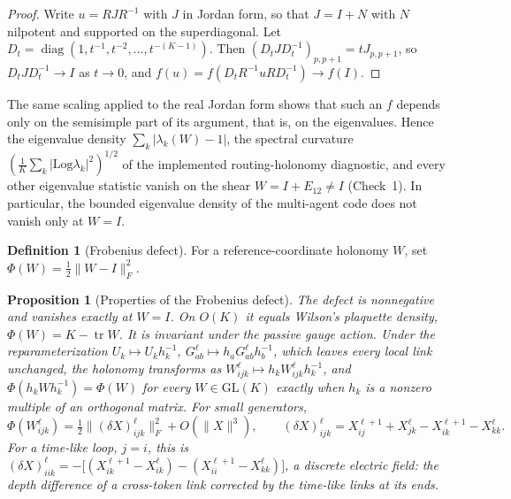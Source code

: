 \documentclass[11pt]{article}
\newtheorem{proposition}[theorem]{Proposition}
\theoremstyle{definition}
\newtheorem{definition}[theorem]{Definition}
\theoremstyle{remark}
\providecommand{\GL}{\mathrm{GL}}
\providecommand{\tr}{\operatorname{tr}}
\begin{document}
\begin{proof}
Write $u=RJR^{-1}$ with $J$ in Jordan form, so that $J=I+N$ with $N$ nilpotent and supported on the superdiagonal. Let $D_t=\operatorname{diag}(1,t^{-1},t^{-2},\dots,t^{-(K-1)})$. Then $(D_tJD_t^{-1})_{p,p+1}=tJ_{p,p+1}$, so $D_tJD_t^{-1}\to I$ as $t\to0$, and $f(u)=f(D_tR^{-1}uRD_t^{-1})\to f(I)$.
\end{proof}

The same scaling applied to the real Jordan form shows that such an $f$ depends only on the semisimple part of its argument, that is, on the eigenvalues. Hence the eigenvalue density $\sum_k|\lambda_k(W)-1|$, the spectral curvature $(\tfrac1K\sum_k|\mathrm{Log}\lambda_k|^2)^{1/2}$ of the implemented routing-holonomy diagnostic, and every other eigenvalue statistic vanish on the shear $W=I+E_{12}\ne I$ (Check~1). In particular, the bounded eigenvalue density of the multi-agent code does not vanish only at $W=I$.

\begin{definition}[Frobenius defect]
\label{dl:def:frob}
For a reference-coordinate holonomy $W$, set $\Phi(W)=\tfrac12\|W-I\|_F^2$.
\end{definition}

\begin{proposition}[Properties of the Frobenius defect]
\label{dl:prop:frob}
The defect is nonnegative and vanishes exactly at $W=I$. On $O(K)$ it equals Wilson's plaquette density, $\Phi(W)=K-\tr W$. It is invariant under the passive gauge action. Under the reparameterization $U_k\mapsto U_kh_k^{-1}$, $G_{ab}^\ell\mapsto h_aG_{ab}^\ell h_b^{-1}$, which leaves every local link unchanged, the holonomy transforms as $W_{ijk}^\ell\mapsto h_kW_{ijk}^\ell h_k^{-1}$, and $\Phi(h_kWh_k^{-1})=\Phi(W)$ for every $W\in\GL(K)$ exactly when $h_k$ is a nonzero multiple of an orthogonal matrix. For small generators,
\begin{equation}
\Phi(W_{ijk}^\ell)=\tfrac12\|(\delta X)_{ijk}^\ell\|_F^2+O(\|X\|^3),\qquad
(\delta X)_{ijk}^\ell=X_{ij}^{\ell+1}+X_{jk}^\ell-X_{ik}^{\ell+1}-X_{kk}^\ell.
\label{dl:eq:delta}
\end{equation}
For a time-like loop, $j=i$, this is $(\delta X)_{iik}^\ell=-\big[(X_{ik}^{\ell+1}-X_{ik}^\ell)-(X_{ii}^{\ell+1}-X_{kk}^\ell)\big]$, a discrete electric field: the depth difference of a cross-token link corrected by the time-like links at its ends.
\end{proposition}
\end{document}
